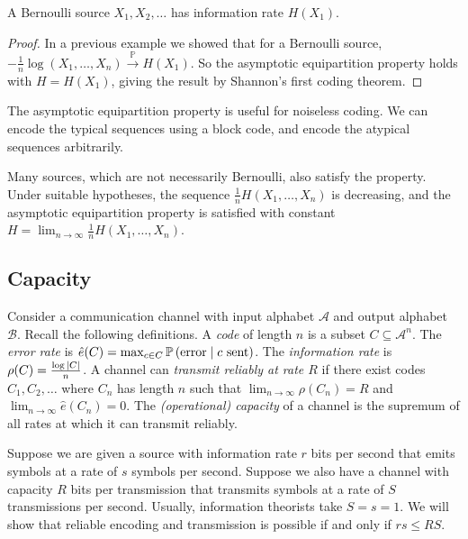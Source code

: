 \begin{corollary}
    A Bernoulli source \( X_1, X_2, \dots \) has information rate \( H(X_1) \).
\end{corollary}
\begin{proof}
    In a previous example we showed that for a Bernoulli source, \( -\frac{1}{n} \log(X_1, \dots, X_n) \xrightarrow{\mathbb P} H(X_1) \).
    So the asymptotic equipartition property holds with \( H = H(X_1) \), giving the result by Shannon's first coding theorem.
\end{proof}
\begin{remark}
    The asymptotic equipartition property is useful for noiseless coding.
    We can encode the typical sequences using a block code, and encode the atypical sequences arbitrarily.

    Many sources, which are not necessarily Bernoulli, also satisfy the property.
    Under suitable hypotheses, the sequence \( \frac{1}{n} H(X_1, \dots, X_n) \) is decreasing, and the asymptotic equipartition property is satisfied with constant \( H = \lim_{n \to \infty} \frac{1}{n} H(X_1, \dots, X_n) \).
\end{remark}

\subsection{Capacity}
Consider a communication channel with input alphabet \( \mathcal A \) and output alphabet \( \mathcal B \).
Recall the following definitions.
A \emph{code} of length \( n \) is a subset \( C \subseteq \mathcal A^n \).
The \emph{error rate} is \( \hat e(C) = \max_{c \in C} \mathbb{P}\left({\text{error} \mid c \text{ sent}}\right) \).
The \emph{information rate} is \( \rho(C) = \frac{\log \abs{C}}{n} \).
A channel can \emph{transmit reliably at rate \( R \)} if there exist codes \( C_1, C_2, \dots \) where \( C_n \) has length \( n \) such that \( \lim_{n \to \infty} \rho(C_n) = R \) and \( \lim_{n \to \infty} \hat e(C_n) = 0 \).
The \emph{(operational) capacity} of a channel is the supremum of all rates at which it can transmit reliably.

Suppose we are given a source with information rate \( r \) bits per second that emits symbols at a rate of \( s \) symbols per second.
Suppose we also have a channel with capacity \( R \) bits per transmission that transmits symbols at a rate of \( S \) transmissions per second.
Usually, information theorists take \( S = s = 1 \).
We will show that reliable encoding and transmission is possible if and only if \( rs \leq RS \).

